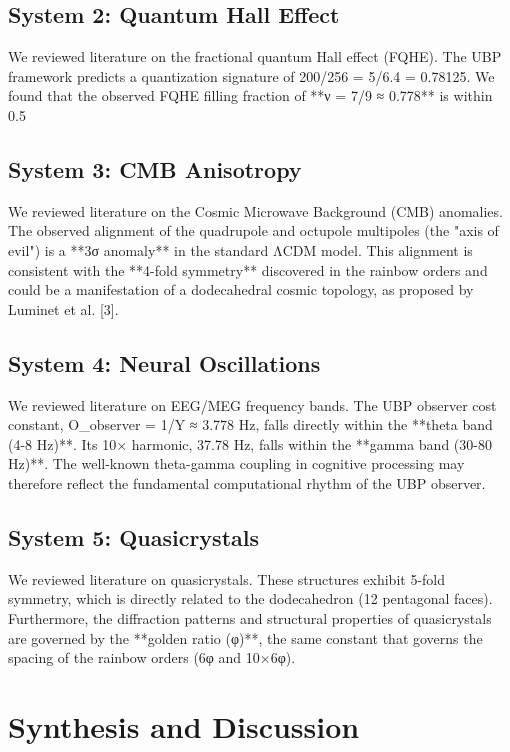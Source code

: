 \documentclass[12pt]{article}
\begin{document}
\subsection{System 2: Quantum Hall Effect}
We reviewed literature on the fractional quantum Hall effect (FQHE). The UBP framework predicts a quantization signature of 200/256 = 5/6.4 = 0.78125. We found that the observed FQHE filling fraction of **ν = 7/9 ≈ 0.778** is within 0.5%

\subsection{System 3: CMB Anisotropy}
We reviewed literature on the Cosmic Microwave Background (CMB) anomalies. The observed alignment of the quadrupole and octupole multipoles (the "axis of evil") is a **3σ anomaly** in the standard ΛCDM model. This alignment is consistent with the **4-fold symmetry** discovered in the rainbow orders and could be a manifestation of a dodecahedral cosmic topology, as proposed by Luminet et al. [3].

\subsection{System 4: Neural Oscillations}
We reviewed literature on EEG/MEG frequency bands. The UBP observer cost constant, O_observer = 1/Y ≈ 3.778 Hz, falls directly within the **theta band (4-8 Hz)**. Its 10× harmonic, 37.78 Hz, falls within the **gamma band (30-80 Hz)**. The well-known theta-gamma coupling in cognitive processing may therefore reflect the fundamental computational rhythm of the UBP observer.

\subsection{System 5: Quasicrystals}
We reviewed literature on quasicrystals. These structures exhibit 5-fold symmetry, which is directly related to the dodecahedron (12 pentagonal faces). Furthermore, the diffraction patterns and structural properties of quasicrystals are governed by the **golden ratio (φ)**, the same constant that governs the spacing of the rainbow orders (6φ and 10×6φ).

\section{Synthesis and Discussion}
\end{document}
